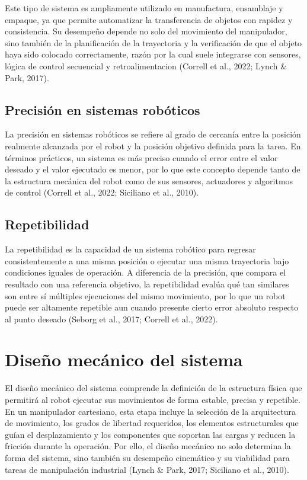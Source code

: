 Este tipo de sistema es ampliamente utilizado en manufactura, ensamblaje y empaque, ya que permite automatizar la transferencia de objetos con rapidez y consistencia. Su desempeño depende no solo del movimiento del manipulador, sino también de la planificación de la trayectoria y la verificación de que el objeto haya sido colocado correctamente, razón por la cual suele integrarse con sensores, lógica de control secuencial y retroalimentacion (Correll et al., 2022; Lynch \& Park, 2017).

\subsection{Precisión en sistemas robóticos}
La precisión en sistemas robóticos se refiere al grado de cercanía entre la posición realmente alcanzada por el robot y la posición objetivo definida para la tarea. En términos prácticos, un sistema es más preciso cuando el error entre el valor deseado y el valor ejecutado es menor, por lo que este concepto depende tanto de la estructura mecánica del robot como de sus sensores, actuadores y algoritmos de control (Correll et al., 2022; Siciliano et al., 2010).

\subsection{Repetibilidad}
La repetibilidad es la capacidad de un sistema robótico para regresar consistentemente a una misma posición o ejecutar una misma trayectoria bajo condiciones iguales de operación. A diferencia de la precisión, que compara el resultado con una referencia objetivo, la repetibilidad evalúa qué tan similares son entre sí múltiples ejecuciones del mismo movimiento, por lo que un robot puede ser altamente repetible aun cuando presente cierto error absoluto respecto al punto deseado (Seborg et al., 2017; Correll et al., 2022).


\section{Diseño mecánico del sistema}
El diseño mecánico del sistema comprende la definición de la estructura física que permitirá al robot ejecutar sus movimientos de forma estable, precisa y repetible. En un manipulador cartesiano, esta etapa incluye la selección de la arquitectura de movimiento, los grados de libertad requeridos, los elementos estructurales que guían el desplazamiento y los componentes que soportan las cargas y reducen la fricción durante la operación. Por ello, el diseño mecánico no solo determina la forma del sistema, sino también su desempeño cinemático y su viabilidad para tareas de manipulación industrial (Lynch \& Park, 2017; Siciliano et al., 2010).

